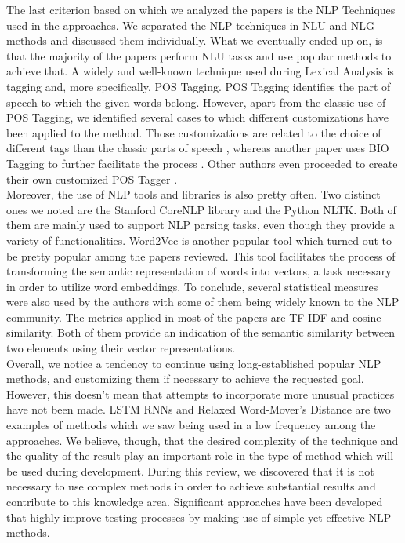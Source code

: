 The last criterion based on which we analyzed the papers is the NLP Techniques used in the approaches. We separated the NLP techniques in NLU and NLG methods and discussed them individually. What we eventually 
ended up on, is that the majority of the papers perform NLU tasks and use popular methods to achieve that. A widely and well-known technique used during Lexical Analysis is tagging and, more specifically, POS Tagging. 
POS Tagging identifies the part of speech to which the given words belong. However, apart from the classic use of POS Tagging, we identified several cases to which different customizations have been applied to the method. 
Those customizations are related to the choice of different tags than the classic parts of speech \cite{9240680}, whereas another paper uses BIO Tagging to further facilitate the process \cite{pedemonte2012towards}. 
Other authors even proceeded to create their own customized POS Tagger \cite{carvalho2014nat2testscr}.\\
Moreover, the use of NLP tools and libraries is also pretty often. Two distinct ones we noted are the Stanford CoreNLP library and the Python NLTK. Both of them are mainly used to support NLP parsing tasks, even though 
they provide a variety of functionalities. Word2Vec is another popular tool which turned out to be pretty popular among the papers reviewed. This tool facilitates the process of transforming the semantic representation of 
words into vectors, a task necessary in order to utilize word embeddings. To conclude, several statistical measures were also used by the authors with some of them being widely known to the NLP community. The metrics applied 
in most of the papers are TF-IDF and cosine similarity. Both of them provide an indication of the semantic similarity between two elements using their vector representations.\\
Overall, we notice a tendency to continue using long-established popular NLP methods, and customizing them if necessary to achieve the requested goal. However, this doesn't mean that attempts to incorporate more unusual 
practices have not been made. LSTM RNNs and Relaxed Word-Mover's Distance are two examples of methods which we saw being used in a low frequency among the approaches. We believe, though, that the desired complexity 
of the technique and the quality of the result play an important role in the type of method which will be used during development. During this review, we discovered that it is not necessary to use complex methods in 
order to achieve substantial results and contribute to this knowledge area. Significant approaches have been developed that highly improve testing processes by making use of simple yet effective NLP methods.
